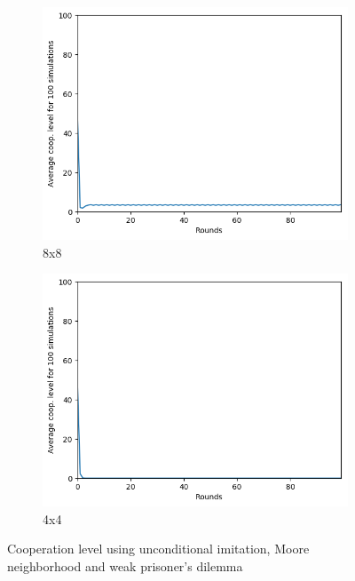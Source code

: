 \documentclass[letterpaper]{article}
\begin{document}
\begin{figure}
\begin{subfigure}{.5\textwidth}
        \centering
        \includegraphics[width=1\linewidth]{images/assign2/8-part1}
        \caption{8x8}
        \label{fig:8moorepart1}
    \end{subfigure}
    \begin{subfigure}{.5\textwidth}
        \centering
        \includegraphics[width=1\linewidth]{images/assign2/4-part1}
        \caption{4x4}
        \label{fig:4moorepart1}
    \end{subfigure}
    \caption{Cooperation level using unconditional imitation, Moore neighborhood
    and weak prisoner's dilemma}
    \label{fig:otherpart1}
\end{figure}
\end{document}
